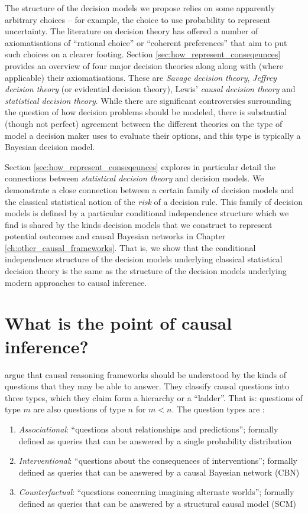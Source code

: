 The structure of the decision models we propose relies on some apparently arbitrary choices -- for example, the choice to use probability to represent uncertainty. The literature on decision theory has offered a number of axiomatisations of ``rational choice'' or ``coherent preferences'' that aim to put such choices on a clearer footing. Section \ref{sec:how_represent_conseqeunces} provides an overview of four major decision theories along along with (where applicable) their axiomatisations. These are \emph{Savage decision theory}, \emph{Jeffrey decision theory} (or evidential decision theory), Lewis' \emph{causal decision theory} and \emph{statistical decision theory}. While there are significant controversies surrounding the question of how decision problems should be modeled, there is substantial (though not perfect) agreement between the different theories on the type of model a decision maker uses to evaluate their options, and this type is typically a Bayesian decision model.

Section \ref{sec:how_represent_conseqeunces} explores in particular detail the connections between \emph{statistical decision theory} \citep{wald_statistical_1950} and decision models. We demonstrate a close connection between a certain family of decision models and the classical statistical notion of the \emph{risk} of a decision rule. This family of decision models is defined by a particular conditional independence structure which we find is shared by the kinds decision models that we construct to represent potential outcomes and causal Bayesian networks in Chapter \ref{ch:other_causal_frameworks}. That is, we show that the conditional independence structure of the decision models underlying classical statistical decision theory is the same as the structure of the decision models underlying modern approaches to causal inference.

\section{What is the point of causal inference?}\label{sec:whats_the_point}

\citet{pearl_book_2018} argue that causal reasoning frameworks should be understood by the kinds of questions that they may be able to answer. They classify causal questions into three types, which they claim form a hierarchy or a ``ladder''. That is: questions of type $m$ are also questions of type $n$ for $m<n$. The question types are \citep{barenboim_foundations_2020}:
\begin{enumerate}
    \item \emph{Associational}: ``questions about relationships and predictions''; formally defined as queries that can be answered by a single probability distribution
    \item \emph{Interventional}: ``questions about the consequences of interventions''; formally defined as queries that can be answered by a causal Bayesian network (CBN)
    \item \emph{Counterfactual}: ``questions concerning imagining alternate worlds''; formally defined as queries that can be answered by a structural causal model (SCM)
\end{enumerate}

